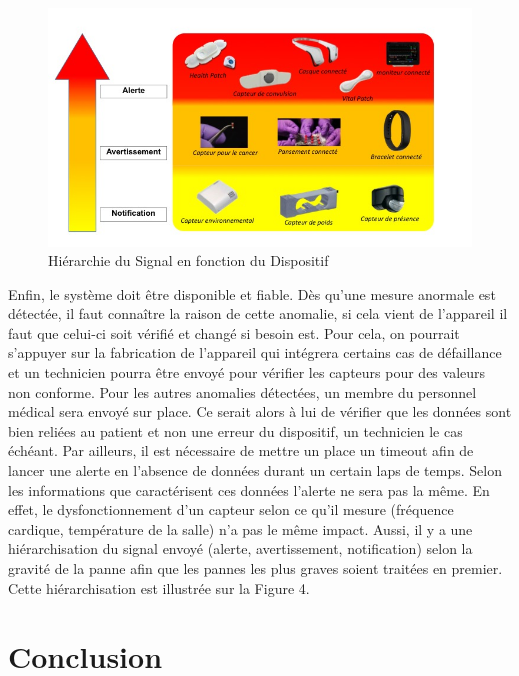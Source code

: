 \documentclass{article}
\begin{document}
\begin{figure}[h!]
	\hspace*{-2.5cm}
	\centering
	\includegraphics[width=1.5\textwidth]{Figure4.jpg}
	\caption{Hiérarchie du Signal en fonction du Dispositif}
	\label{fig:balance}
\end{figure}

Enfin, le système doit être disponible et fiable. Dès qu’une mesure anormale est détectée, il faut connaître la raison de cette anomalie, si cela vient de l'appareil il faut que celui-ci soit vérifié et changé si besoin est. Pour cela, on pourrait s’appuyer sur la fabrication de l'appareil qui intégrera certains cas de défaillance et un technicien pourra être envoyé pour vérifier les capteurs pour des valeurs non conforme. Pour les autres anomalies détectées, un membre du personnel médical sera envoyé sur place. Ce serait alors à lui de vérifier que les données sont bien reliées au patient et non une erreur du dispositif, un technicien le cas échéant. Par ailleurs, il est nécessaire de mettre un place un timeout afin de lancer une alerte en l’absence de données durant un certain laps de temps. Selon les informations que caractérisent ces données l’alerte ne sera pas la même. En effet, le dysfonctionnement d’un capteur selon ce qu’il mesure (fréquence cardique, température de la salle) n’a pas le même impact. Aussi, il y a une hiérarchisation du signal envoyé (alerte, avertissement, notification) selon la gravité de la panne afin que les pannes les plus graves soient traitées en premier. Cette hiérarchisation est illustrée sur la Figure 4.

\section{ Conclusion }
 







\end{document}
